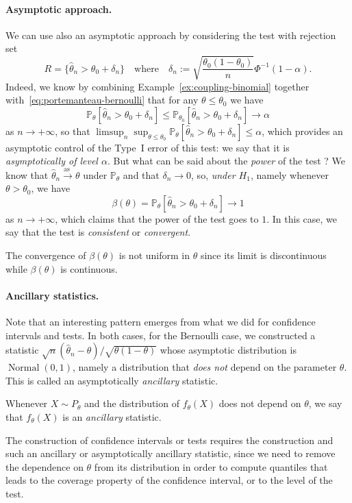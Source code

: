 \documentclass[
	fontsize=11pt, %
	twoside=false, %
	numbers=noenddot, %
]{kaobook}
\DeclareMathOperator{\nor}{Normal}
\renewcommand{\P}{\mathbb P}
\newcommand{\wh}{\widehat}
\newcommand{\goes}{\rightarrow}
\newcommand{\go}{\rightarrow}
\newcommand{\goas}{\overset{\text{as\ }}{\rightarrow}}
\begin{document}
\paragraph{Asymptotic approach.}

We can use also an asymptotic approach by considering the test with rejection set
\begin{equation*}
	R = \big\{ \wh \theta_n > \theta_0  + \delta_n \big\} \quad \text{where} \quad \delta_n	:= \sqrt{\frac{\theta_0 (1 - \theta_0)}{n}} \Phi^{-1}(1 - \alpha).
\end{equation*}
Indeed, we know by combining Example~\ref{ex:coupling-binomial} together with~\eqref{eq:portemanteau-bernoulli} that for any $\theta \leq \theta_0$ we have
\begin{equation*}
	\P_\theta[ \wh \theta_n > \theta_0  + \delta_n ] \leq \P_{\theta_0}[ \wh \theta_n > \theta_0  + \delta_n ] \goes \alpha
\end{equation*}
as $n \goes +\infty$, so that $\limsup_n \sup_{\theta \leq \theta_0} \P_\theta[ \wh \theta_n > \theta_0  + \delta_n ] \leq \alpha$, which provides an asymptotic control of the Type~I error of this test: we say that it is \emph{asymptotically of level $\alpha$}.
But what can be said about the \emph{power} of the test ?
We know that $\wh \theta_n \goas \theta$ under $\P_\theta$ and that $\delta_n \go 0$, so, \emph{under $H_1$}, namely whenever $\theta > \theta_0$, we have
\begin{equation*}
	\beta(\theta) = \P_\theta[ \wh \theta_n > \theta_0 + \delta_n] \go 1
\end{equation*}
as $n \go +\infty$, which claims that the power of the test goes to $1$.
In this case, we say that the test is \emph{consistent} or \emph{convergent}.
\begin{remark}
 	The convergence of $\beta(\theta)$ is not uniform in $\theta$ since its limit is discontinuous while $\beta(\theta)$ is continuous.
\end{remark}

\paragraph{Ancillary statistics.}

Note that an interesting pattern emerges from what we did for confidence intervals and tests.
In both cases, for the Bernoulli case, we constructed a statistic 
$\sqrt n (\wh \theta_n - \theta) / \sqrt{\theta (1 - \theta)}$ whose asymptotic distribution is $\nor(0, 1)$, namely a distribution that \emph{does not} depend on the parameter $\theta$.
This is called an asymptotically \emph{ancillary} statistic.
\begin{definition}
	Whenever $X \sim P_\theta$ and the distribution of $f_\theta(X)$ does not depend on $\theta$, we say that $f_\theta(X)$ is an \emph{ancillary} statistic.
\end{definition}
The construction of confidence intervals or tests requires the construction and such an ancillary or asymptotically ancillary statistic, since we need to remove the dependence on $\theta$ from its distribution in order to compute quantiles that leads to the coverage property of the confidence interval, or to the level of the test.
\end{document}
